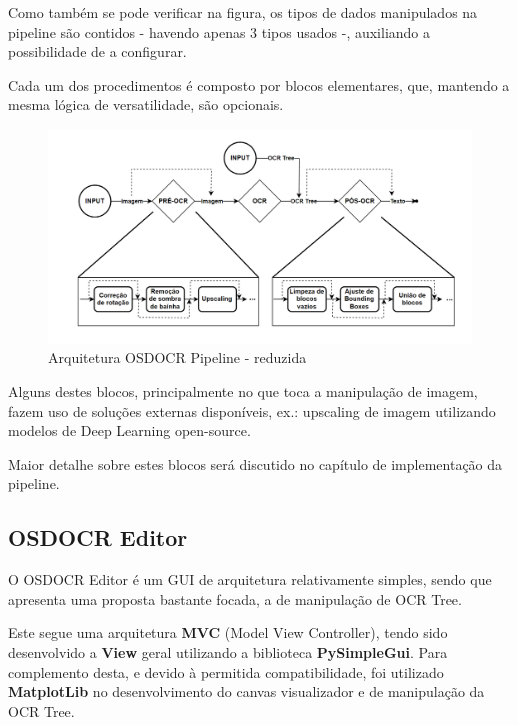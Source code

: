 Como também se pode verificar na figura, os tipos de dados manipulados na pipeline são contidos - havendo apenas 3 tipos usados -, auxiliando a possibilidade de a configurar.


Cada um dos procedimentos é composto por blocos elementares, que, mantendo a mesma lógica de versatilidade, são opcionais.


\begin{figure}[H]
	\centering
	\includegraphics[width=1\textwidth]{images/diagramas/arquitetura_pipeline_reduced.png}
	\caption{Arquitetura OSDOCR Pipeline - reduzida}
	\label{fig:arquitetura_pipeline_reduced}
\end{figure}

Alguns destes blocos, principalmente no que toca a manipulação de imagem, fazem uso de soluções externas disponíveis, ex.: upscaling de imagem utilizando modelos de Deep Learning open-source.

Maior detalhe sobre estes blocos será discutido no capítulo de implementação da pipeline.


\subsection{OSDOCR Editor}

O OSDOCR Editor é um GUI de arquitetura relativamente simples, sendo que apresenta uma proposta bastante focada, a de manipulação de OCR Tree. 

Este segue uma arquitetura \textbf{MVC} (Model View Controller), tendo sido desenvolvido a \textbf{View} geral utilizando a biblioteca \textbf{PySimpleGui}. Para complemento desta, e devido à permitida compatibilidade, foi utilizado \textbf{MatplotLib} no desenvolvimento do canvas visualizador e de manipulação da OCR Tree.

